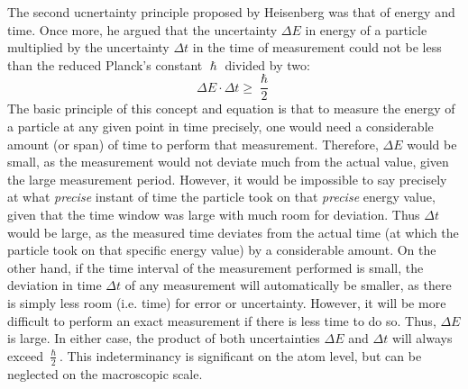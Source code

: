 The second ucnertainty principle proposed by Heisenberg was that of energy and time. Once more, he argued that the uncertainty $\Delta E$ in energy of a particle multiplied by the uncertainty $\Delta t$ in the time of measurement could not be less than the reduced Planck's constant $\hslash$ divided by two: $$\Delta E \cdot \Delta t \geq \frac{\hslash}{2}$$ The basic principle of this concept and equation is that to measure the energy of a particle at any given point in time precisely, one would need a considerable amount (or span) of time to perform that measurement. Therefore, $\Delta E$ would be small, as the measurement would not deviate much from the actual value, given the large measurement period. However, it would be impossible to say precisely at what \emph{precise} instant of time the particle took on that \emph{precise} energy value, given that the time window was large with much room for deviation. Thus $\Delta t$ would be large, as the measured time deviates from the actual time (at which the particle took on that specific energy value) by a considerable amount. On the other hand, if the time interval of the measurement performed is small, the deviation in time $\Delta t$ of any measurement will automatically be smaller, as there is simply less room (i.e. time) for error or uncertainty. However, it will be more difficult to perform an exact measurement if there is less time to do so. Thus, $\Delta E$ is large. In either case, the product of both uncertainties $\Delta E$ and $\Delta t$ will always exceed $\frac{\hslash}{2}$. This indeterminancy is significant on the atom level, but can be neglected on the macroscopic scale.


